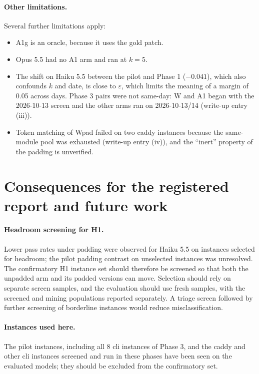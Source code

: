 \documentclass[10pt]{article}
\newcommand{\eps}{\varepsilon}
\begin{document}
\paragraph{Other limitations.} Several further limitations apply:
\begin{itemize}
\item A1g is an oracle, because it uses the gold patch.
\item Opus 5.5 had no A1 arm and ran at $k=5$.
\item The shift on Haiku 5.5 between the pilot and Phase 1 ($-0.041$), which also confounds $k$ and date, is close to $\eps$, which limits the meaning of a margin of 0.05 across days. Phase 3 pairs were not same-day: W and A1 began with the 2026-10-13 screen and the other arms ran on 2026-10-13/14 (write-up entry (iii)).
\item Token matching of Wpad failed on two caddy instances because the same-module pool was exhausted (write-up entry (iv)), and the ``inert'' property of the padding is unverified.
\end{itemize}

\section{Consequences for the registered report and future work}

\paragraph{Headroom screening for H1.} Lower pass rates under padding were observed for Haiku 5.5 on instances selected for headroom; the pilot padding contrast on unselected instances was unresolved. The confirmatory H1 instance set should therefore be screened so that both the unpadded arm and its padded versions can move. Selection should rely on separate screen samples, and the evaluation should use fresh samples, with the screened and mining populations reported separately. A triage screen followed by further screening of borderline instances would reduce misclassification.

\paragraph{Instances used here.} The pilot instances, including all 8 cli instances of Phase 3, and the caddy and other cli instances screened and run in these phases have been seen on the evaluated models; they should be excluded from the confirmatory set.
\end{document}
